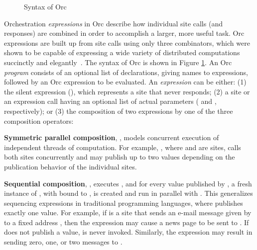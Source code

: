 \documentclass{eptcs}
\begin{document}
\begin{figure}
	\centering
	\caption{Syntax of Orc}
	\label{fig:syntax}
\end{figure}

Orchestration \emph{expressions} in Orc describe how individual site calls (and responses) are combined in order to accomplish a larger, more useful task. Orc expressions are built up from site calls using only three combinators, which were shown to be capable of expressing a wide variety of distributed computations succinctly and elegantly~\cite{OrcTheory05}. 
The syntax of Orc is shown in Figure \ref{fig:syntax}. An Orc \emph{program} consists of an optional list of declarations, giving names to expressions, followed 
by an Orc expression to be evaluated. 
An \emph{expression} can be either: (1) the silent expression (), 
which represents a site that never responds; (2) a site or an expression call having 
an optional list of actual parameters ( and , respectively); or (3) the composition of two expressions by one of the three composition operators: 

\textbf{Symmetric parallel composition}, , models concurrent execution of independent threads of computation. For example, , where  and  are sites, calls both sites concurrently and may publish up to two values depending on the publication behavior of the individual sites.

\textbf{Sequential composition}, , executes , and for every value  published by , a fresh instance of , with  bound to , is created  and run in parallel with . This generalizes sequencing expressions in traditional programming languages, where  publishes exactly one value. For example, if  is a site that sends an e-mail message given by  to a fixed address , then the expression  may cause a news page to be sent to . If   does not publish a value,  is never invoked. Similarly, the expression  may result in sending zero, one, or two messages to . 
\end{document}
